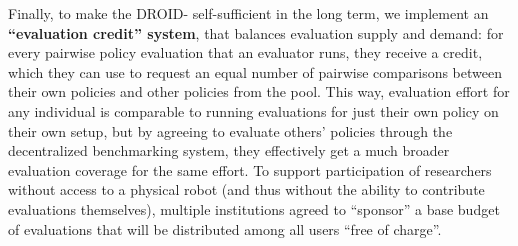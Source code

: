Finally, to make the DROID-\Acronym{} self-sufficient in the long term, we implement an \textbf{``evaluation credit'' system}, that balances evaluation supply and demand: for every pairwise policy evaluation that an evaluator runs, they receive a credit, which they can use to request an equal number of pairwise comparisons between their own policies and other policies from the pool. This way, evaluation effort for any individual is comparable to running evaluations for just their own policy on their own setup, but by agreeing to evaluate others' policies through the decentralized benchmarking system, they effectively get a much broader evaluation coverage for the same effort. To support participation of researchers without access to a physical robot (and thus without the ability to contribute evaluations themselves), multiple institutions agreed to ``sponsor'' a base budget of evaluations that will be distributed among all users ``free of charge''. 
